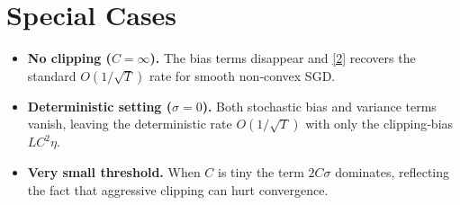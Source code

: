\documentclass{article}
\begin{document}
\section*{Special Cases}
\begin{itemize}
\item \textbf{No clipping ($C=\infty$).}  The bias terms disappear and
\eqref{2} recovers the standard $O(1/\sqrt{T})$ rate for smooth non‑convex SGD.
\item \textbf{Deterministic setting ($\sigma=0$).}  Both stochastic
bias and variance terms vanish, leaving the deterministic rate
$O(1/\sqrt{T})$ with only the clipping‑bias $LC^{2}\eta$.
\item \textbf{Very small threshold.}  When $C$ is tiny the term $2C\sigma$
dominates, reflecting the fact that aggressive clipping can hurt
convergence.
\end{itemize}

\end{document}
